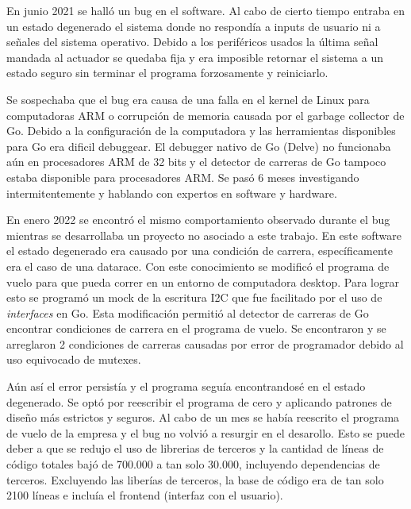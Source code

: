 En junio 2021 se halló un bug en el software. Al cabo de cierto tiempo entraba en un estado degenerado el sistema donde no respondía a inputs de usuario ni a señales del sistema operativo. Debido a los periféricos usados la última señal mandada al actuador se quedaba fija y era imposible retornar el sistema a un estado seguro sin terminar el programa forzosamente y reiniciarlo. 

Se sospechaba que el bug era causa de una falla en el kernel de Linux para computadoras ARM o corrupción de memoria causada por el garbage collector de Go. Debido a la configuración de la computadora y las herramientas disponibles para Go era dificil debuggear. El debugger nativo de Go (Delve) no funcionaba aún en procesadores ARM de 32 bits y el detector de carreras de Go tampoco estaba disponible para procesadores ARM. Se pasó 6 meses investigando intermitentemente y hablando con expertos en software y hardware.

En enero 2022 se encontró el mismo comportamiento observado durante el bug mientras se desarrollaba un proyecto no asociado a este trabajo. En este software el estado degenerado era causado por una condición de carrera, específicamente era el caso de una \gls{datarace}. Con este conocimiento se modificó el programa de vuelo para que pueda correr en un entorno de computadora desktop. Para lograr esto se programó un mock de la escritura I2C que fue facilitado por el uso de \textit{interfaces} en Go. Esta modificación permitió al detector de carreras de Go encontrar condiciones de carrera en el programa de vuelo. Se encontraron y se arreglaron 2 condiciones de carreras causadas por error de programador debido al uso equivocado de mutexes.

Aún así el error persistía y el programa seguía encontrandosé en el estado degenerado. Se optó por reescribir el programa de cero y aplicando patrones de diseño más estrictos y seguros. Al cabo de un mes se había reescrito el programa de vuelo de la empresa y el bug no volvió a resurgir en el desarollo. Esto se puede deber a que se redujo el uso de librerias de terceros y la cantidad de líneas de código totales bajó de 700.000 a tan solo 30.000, incluyendo dependencias de terceros. Excluyendo las liberías de terceros, la base de código era de tan solo 2100 líneas e incluía el frontend (interfaz con el usuario).

